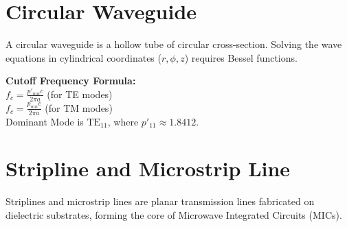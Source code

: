 \documentclass[12pt,a4paper]{article}
\begin{document}
\section{Circular Waveguide}

A circular waveguide is a hollow tube of circular cross-section. Solving the wave equations in cylindrical coordinates ($r, \phi, z$) requires Bessel functions.

\begin{tcolorbox}[tikzbox, title={Circular Waveguide Cross-Section}]
\begin{minipage}[c]{0.45\linewidth}
\centering
{}
\end{minipage}\hfill
\begin{minipage}[c]{0.5\linewidth}
\raggedright
\textbf{Cutoff Frequency Formula:}\\[3pt]
$f_c = \frac{p'_{mn} c}{2\pi a}$ \quad (for TE modes)\\[2pt]
$f_c = \frac{p_{mn} c}{2\pi a}$ \quad (for TM modes)\\[4pt]
Dominant Mode is \textbf{$\text{TE}_{11}$}, where $p'_{11} \approx 1.8412$.
\end{minipage}
\end{tcolorbox}

\section{Stripline and Microstrip Line}

Striplines and microstrip lines are planar transmission lines fabricated on dielectric substrates, forming the core of Microwave Integrated Circuits (MICs).
\end{document}
